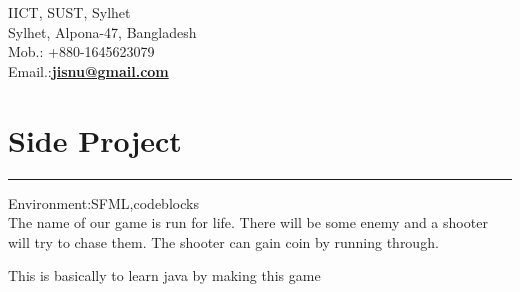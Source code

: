 \documentclass[]{rahulworld-resume}
\begin{document}
\begin{minipage}[t]{0.66\textwidth} 
\hspace*{0pt}\hfill    \\
\hspace*{0pt}\hfill    \\
\hspace*{0pt}\hfill IICT, SUST, Sylhet \\
\hspace*{0pt}\hfill Sylhet, Alpona-47, Bangladesh \\
\hspace*{0pt}\hfill Mob.: +880-1645623079 \\
\hspace*{0pt}\hfill Email.:\textbf{\href{mailto:jisnu1024@gmail.com}{jisnu@gmail.com}} \\



\section{Side Project}
\noindent\rule{12.5cm}{0.4pt}



 
\noindent
\hspace{5em}%
\begin{minipage}{0.85\textwidth\vspace{5pt}}
Environment:SFML,codeblocks\\
 The name of our game is run for life. There will be some enemy and a shooter will try to chase them. The shooter can gain coin by running through.
\end{minipage}






 


 
\noindent
\hspace{5em}%
\begin{minipage}{0.85\textwidth\vspace{5pt}}
This is basically to learn java by making this game
\end{minipage}







\end{minipage}
\end{document}
